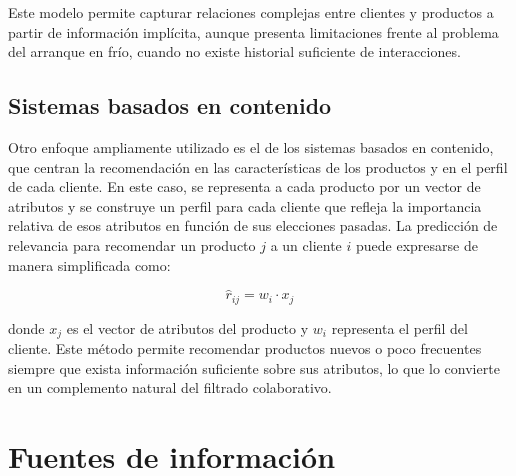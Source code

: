 Este modelo permite capturar relaciones complejas entre clientes y productos a partir de información implícita, aunque presenta limitaciones frente al problema del arranque en frío, cuando no existe historial suficiente de interacciones.

\subsection{Sistemas basados en contenido}

Otro enfoque ampliamente utilizado es el de los sistemas basados en contenido, que centran la recomendación en las características de los productos y en el perfil de cada cliente. En este caso, se representa a cada producto por un vector de atributos y se construye un perfil para cada cliente que refleja la importancia relativa de esos atributos en función de sus elecciones pasadas. La predicción de relevancia para recomendar un producto $j$ a un cliente $i$ puede expresarse de manera simplificada como:

\begin{equation}
\label{eq:prediccion_cb}
\hat{r}_{ij} = w_i \cdot x_j
\end{equation}

donde $x_j$ es el vector de atributos del producto y $w_i$ representa el perfil del cliente. Este método permite recomendar productos nuevos o poco frecuentes siempre que exista información suficiente sobre sus atributos, lo que lo convierte en un complemento natural del filtrado colaborativo.


\section{Fuentes de información}




